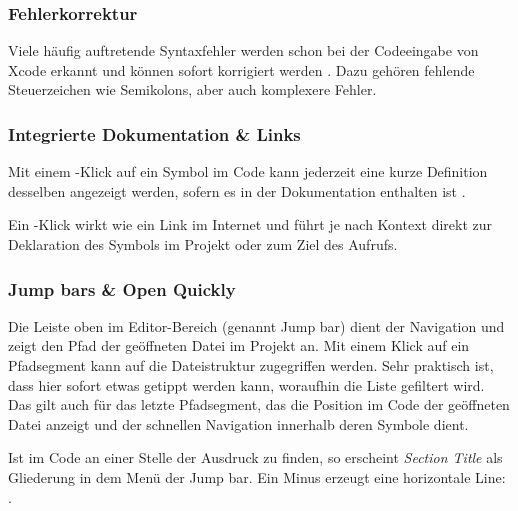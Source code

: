\documentclass[parskip=half, final]{scrreprt}
\begin{document}

\subsubsection{Fehlerkorrektur}

Viele häufig auftretende Syntaxfehler werden schon bei der Codeeingabe von Xcode erkannt und können sofort korrigiert werden . Dazu gehören fehlende Steuerzeichen wie Semikolons, aber auch komplexere Fehler.


\subsubsection{Integrierte Dokumentation \& Links}\label{sec:quickdef}

Mit einem \keys{\Alt}-Klick auf ein Symbol im Code kann jederzeit eine kurze Definition desselben angezeigt werden, sofern es in der Dokumentation enthalten ist .


Ein \keys{\cmd}-Klick wirkt wie ein Link im Internet und führt je nach Kontext direkt zur Deklaration des Symbols im Projekt oder zum Ziel des Aufrufs.

\subsubsection{Jump bars \& Open Quickly}

Die Leiste oben im Editor-Bereich (genannt Jump bar) dient der Navigation und zeigt den Pfad der geöffneten Datei im Projekt an. Mit einem Klick auf ein Pfadsegment kann auf die Dateistruktur zugegriffen werden. Sehr praktisch ist, dass hier sofort etwas getippt werden kann, woraufhin die Liste gefiltert wird. Das gilt auch für das letzte Pfadsegment, das die Position im Code der geöffneten Datei anzeigt und der schnellen Navigation innerhalb deren Symbole dient.

 Ist im Code an einer Stelle der Ausdruck  zu finden, so erscheint \emph{Section Title} als Gliederung in dem Menü der Jump bar. Ein Minus erzeugt eine horizontale Line: .
\end{document}
